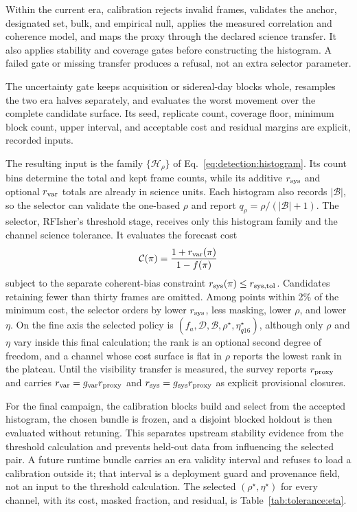 Within the current era, calibration rejects invalid frames, validates the
anchor, designated set, bulk, and empirical null, applies the measured
correlation and coherence model, and maps the proxy through the declared
science transfer.  It also applies stability and coverage gates before
constructing the histogram.  A failed gate or missing transfer produces a
refusal, not an extra selector parameter.

The uncertainty gate keeps acquisition or sidereal-day blocks whole, resamples
the two era halves separately, and evaluates the worst movement over the
complete candidate surface.  Its seed, replicate count, coverage floor, minimum
block count, upper interval, and acceptable cost and residual margins are
explicit, recorded inputs.

The resulting input is the family $\{\mathcal H_\rho\}$ of
Eq.~\eqref{eq:detection:histogram}.  Its count bins determine the total and kept
frame counts, while its additive $r_{\rm sys}$ and optional $r_{\rm var}$ totals
are already in science units.  Each histogram also records $|\mathcal B|$, so the
selector can validate the one-based $\rho$ and report
$q_\rho=\rho/(|\mathcal B|+1)$.  The selector, RFIsher's threshold stage,
receives only this histogram family and the channel science tolerance.  It
evaluates the forecast cost
\begin{equation}
  \mathcal{C}(\pi)=\frac{1+r_{\rm var}(\pi)}{1-f(\pi)}
\end{equation}
subject to the separate coherent-bias constraint
$r_{\rm sys}(\pi)\le r_{{\rm sys},\rm tol}$.  Candidates retaining fewer than
thirty frames are omitted.  Among points within 2\% of the minimum cost, the
selector orders by lower $r_{\rm sys}$, less masking, lower $\rho$, and lower
$\eta$.  On the fine axis the selected policy is
$(f_a,\mathcal D,\mathcal B,\rho^\star,\eta^\star_{q16})$, although only $\rho$
and $\eta$ vary inside this final calculation; the rank is an optional second
degree of freedom, and a channel whose cost surface is flat in $\rho$ reports
the lowest rank in the plateau.  Until the visibility transfer is measured, the
survey reports $r_{\rm proxy}$ and carries $r_{\rm var}=g_{\rm var}r_{\rm proxy}$
and $r_{\rm sys}=g_{\rm sys}r_{\rm proxy}$ as explicit provisional closures.

For the final campaign, the calibration blocks build and select from the
accepted histogram, the chosen bundle is frozen, and a disjoint blocked holdout
is then evaluated without retuning.  This separates upstream stability evidence
from the threshold calculation and prevents held-out data from influencing the
selected pair.  A future runtime bundle carries an era validity interval and
refuses to load a calibration outside it; that interval is a deployment guard
and provenance field, not an input to the threshold calculation.  The selected
$(\rho^\star,\eta^\star)$ for every channel, with its cost, masked fraction, and
residual, is Table~\ref{tab:tolerance:eta}.

